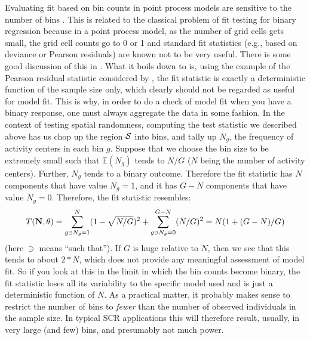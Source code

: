 {Evaluating fit based on bin counts in point process models are
sensitive to the number of bins \citep[][p. 87-88]{illian_etal:2008}.
This is related to the classical problem of fit testing for binary
regression because in a point process model, as the number of grid
cells gets small, the grid cell counts go to 0 or 1 and standard fit
statistics (e.g., based on deviance or Pearson residuals) are known
not to be very useful.  There is some good discussion of this in
\citet[][Sec. 4.4.5]{mccullagh_nelder:1989}.
 What it boils down to is, using
the example of the Pearson residual statistic considered by
\citet{mccullagh_nelder:1989}, the fit statistic is exactly a
deterministic function of the sample size only, which clearly should
not be regarded as useful for model fit. This is why, in order to do a
check of model fit when you have a binary response, one must always
aggregate the data in some fashion.  In the context of testing spatial
randomness, computing the test statistic we described above has us chop up the
region ${\cal S}$ into bins, and tally up $N_{g}$, the
frequency of activity centers in each bin $g$.  %
Suppose that we choose the
bin size to be extremely small such that %
$\mathbb{E}(N_{g})$
tends to $N/G$ ($N$ being the number of activity centers).  Further,
$N_{g}$ tends to a binary outcome. Therefore the fit statistic has $N$
components that have value $N_{g} = 1$, and it has
 $G-N$
components that have value $N_{g} = 0$. Therefore, the fit statistic
resembles:
\[
T({\bf N},\theta) = \sum_{g \ni N_{g} = 1}^{N}  (1 - \sqrt{N/G})^2 +
\sum_{g \ni N_{g} = 0}^{G-N} (N/G)^2
 = N(1 + (G-N)/G)
\]
(here $\ni$ means ``such that''). If $G$ is huge
relative to $N$, then we see that this tends to about $2*N$, which
does not provide any meaningful assessment of model fit.  So if you
look at this in the limit in which the bin counts become binary, the
fit statistic loses all its variability to the specific model used and
is just a deterministic function of $N$. As a practical matter, it
probably makes sense to restrict the number of bins to {\it fewer}
than the number of observed individuals in the sample size. In typical
SCR
applications this will therefore result, usually, in very large (and
few) bins, and presumably not much power.


}
